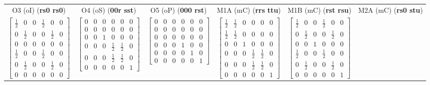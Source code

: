 \documentclass[preprint]{iucr}              %
\newcommand{\charseq}[1]{({\bf #1})}
\begin{document}
\begin{table}
\begin{tabular}{cccccc}
			\midrule
			O3 (oI) \charseq{rs0 rs0} & O4 (oS) \charseq{00r sst} & O5 (oP) \charseq{000 rst} & M1A (mC) \charseq{rrs ttu} & M1B (mC) \charseq{rst rsu} & M2A (mC) \charseq{rs0 stu} \\[2pt]
			$\begin{bmatrix} \tfrac{1}{2} & 0 & 0 & \tfrac{1}{2} & 0 & 0 \\ 0 & \tfrac{1}{2} & 0 & 0 & \tfrac{1}{2} & 0 \\ 0 & 0 & 0 & 0 & 0 & 0 \\ \tfrac{1}{2} & 0 & 0 & \tfrac{1}{2} & 0 & 0 \\ 0 & \tfrac{1}{2} & 0 & 0 & \tfrac{1}{2} & 0 \\ 0 & 0 & 0 & 0 & 0 & 0 \end{bmatrix}$ &
			$\begin{bmatrix} 0 & 0 & 0 & 0 & 0 & 0 \\ 0 & 0 & 0 & 0 & 0 & 0 \\ 0 & 0 & 1 & 0 & 0 & 0 \\ 0 & 0 & 0 & \tfrac{1}{2} & \tfrac{1}{2} & 0 \\ 0 & 0 & 0 & \tfrac{1}{2} & \tfrac{1}{2} & 0 \\ 0 & 0 & 0 & 0 & 0 & 1 \end{bmatrix}$ &
			$\begin{bmatrix} 0 & 0 & 0 & 0 & 0 & 0 \\ 0 & 0 & 0 & 0 & 0 & 0 \\ 0 & 0 & 0 & 0 & 0 & 0 \\ 0 & 0 & 0 & 1 & 0 & 0 \\ 0 & 0 & 0 & 0 & 1 & 0 \\ 0 & 0 & 0 & 0 & 0 & 1 \end{bmatrix}$ &
			$\begin{bmatrix} \tfrac{1}{2} & \tfrac{1}{2} & 0 & 0 & 0 & 0 \\ \tfrac{1}{2} & \tfrac{1}{2} & 0 & 0 & 0 & 0 \\ 0 & 0 & 1 & 0 & 0 & 0 \\ 0 & 0 & 0 & \tfrac{1}{2} & \tfrac{1}{2} & 0 \\ 0 & 0 & 0 & \tfrac{1}{2} & \tfrac{1}{2} & 0 \\ 0 & 0 & 0 & 0 & 0 & 1 \end{bmatrix}$ &
			$\begin{bmatrix} \tfrac{1}{2} & 0 & 0 & \tfrac{1}{2} & 0 & 0 \\ 0 & \tfrac{1}{2} & 0 & 0 & \tfrac{1}{2} & 0 \\ 0 & 0 & 1 & 0 & 0 & 0 \\ \tfrac{1}{2} & 0 & 0 & \tfrac{1}{2} & 0 & 0 \\ 0 & \tfrac{1}{2} & 0 & 0 & \tfrac{1}{2} & 0 \\ 0 & 0 & 0 & 0 & 0 & 1 \end{bmatrix}$ &

\end{tabular}
\end{table}
\end{document}

